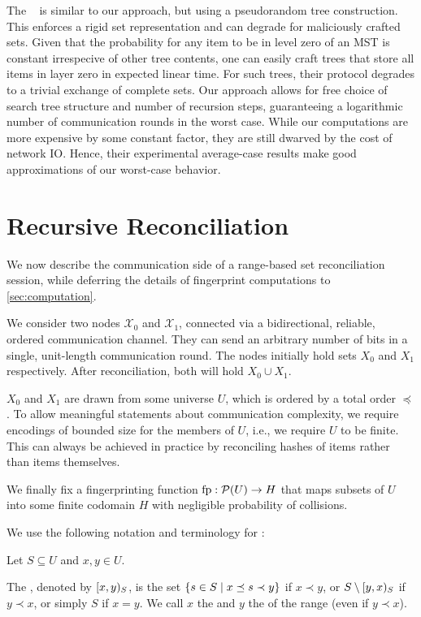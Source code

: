 \documentclass[conference]{IEEEtran}
\newcommand{\peer}[1]{\ensuremath{\mathcal{X}_{#1}}}
\begin{document}
The ~\cite{auvolat2019merkle} is similar to our approach, but using a pseudorandom tree construction. This enforces a rigid set representation and can degrade for maliciously crafted sets. Given that the probability for any item to be in level zero of an MST is constant irrespecive of other tree contents, one can easily craft trees that store all items in layer zero in expected linear time. For such trees, their protocol degrades to a trivial exchange of complete sets. Our approach allows for free choice of search tree structure and number of recursion steps, guaranteeing a logarithmic number of communication rounds in the worst case. While our computations are more expensive by some constant factor, they are still dwarved by the cost of network IO. Hence, their experimental average-case results make good approximations of our worst-case behavior.

\section{Recursive Reconciliation}\label{reconciliation}

We now describe the communication side of a range-based set reconciliation session, while deferring the details of fingerprint computations to \cref{sec:computation}. 

We consider two nodes \peer{0} and \peer{1}, connected via a bidirectional, reliable, ordered communication channel. They can send an arbitrary number of bits in a single, unit-length communication round. The nodes initially hold sets $X_0$ and $X_1$ respectively. After reconciliation, both will hold $X_0 \cup X_1$.

$X_0$ and $X_1$ are drawn from some universe $U$, which is ordered by a total order $\preceq$. To allow meaningful statements about communication complexity, we require encodings of bounded size for the members of $U$, i.e., we require $U$ to be finite. This can always be achieved in practice by reconciling hashes of items rather than items themselves.

We finally fix a fingerprinting function ${\operatorname{fp}}: {\mathcal{P}({U})} \rightarrow {H}$ that maps subsets of $U$ into some finite codomain $H$ with negligible probability of collisions.

We use the following notation and terminology for :

\begin{definition}
\label{def:ranges}
Let $S \subseteq U$  and $x, y \in U$.

The , denoted by $[{x},{y})_{S}$, is the set $\{s \in S \mid x \preceq s \prec y\}$ if $x \prec y$, or $S \setminus [{y},{x})_{S}$ if $y \prec x$, or simply $S$ if $x = y$. We call $x$ the  and $y$ the  of the range (even if $y \prec x$).
\end{definition}
\end{document}
